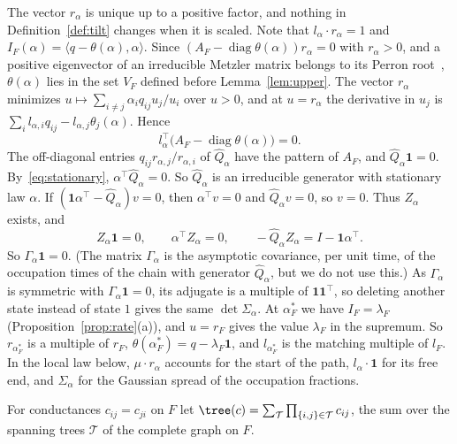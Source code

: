 The vector $r_\alpha$ is unique up to a positive factor, and nothing in
Definition~\ref{def:tilt} changes when it is scaled. Note that
$l_\alpha\cdot r_\alpha=1$ and $I_F(\alpha)=\langle q-\theta(\alpha),\alpha\rangle$.
Since $(A_F-\operatorname{diag}\theta(\alpha))r_\alpha=0$ with $r_\alpha>0$, and
a positive eigenvector of an irreducible Metzler matrix belongs to its Perron
root~\cite{bermanplemmons1994}, $\theta(\alpha)$ lies in the set $V_F$ defined
before Lemma~\ref{lem:upper}. The vector $r_\alpha$
minimizes $u\mapsto\sum_{i\ne j}\alpha_iq_{ij}u_j/u_i$ over $u>0$, and at
$u=r_\alpha$ the derivative in $u_j$ is
$\sum_il_{\alpha,i}q_{ij}-l_{\alpha,j}\theta_j(\alpha)$. Hence
\begin{equation}\label{eq:stationary}
l_\alpha^\top\bigl(A_F-\operatorname{diag}\theta(\alpha)\bigr)=0 .
\end{equation}
The off-diagonal entries $q_{ij}r_{\alpha,j}/r_{\alpha,i}$ of
$\widehat Q_\alpha$ have the pattern of $A_F$, and $\widehat Q_\alpha\mathbf 1=0$.
By~\eqref{eq:stationary}, $\alpha^\top\widehat Q_\alpha=0$. So
$\widehat Q_\alpha$ is an irreducible generator with stationary law $\alpha$.
If $(\mathbf 1\alpha^\top-\widehat Q_\alpha)v=0$, then $\alpha^\top v=0$ and
$\widehat Q_\alpha v=0$, so $v=0$. Thus $Z_\alpha$ exists, and
\begin{equation}\label{eq:Zprops}
Z_\alpha\mathbf 1=0,\qquad\alpha^\top Z_\alpha=0,\qquad
-\widehat Q_\alpha Z_\alpha=I-\mathbf 1\alpha^\top .
\end{equation}
So $\Gamma_\alpha\mathbf 1=0$. (The matrix $\Gamma_\alpha$ is the asymptotic
covariance, per unit time, of the occupation times of the chain with
generator $\widehat Q_\alpha$, but we do not use this.) As $\Gamma_\alpha$ is
symmetric with $\Gamma_\alpha\mathbf 1=0$, its adjugate is a multiple of
$\mathbf 1\mathbf 1^\top$, so deleting another state instead of state $1$
gives the same $\det\Sigma_\alpha$. At $\alpha^*_F$ we have
$I_F=\lambda_F$ (Proposition~\ref{prop:rate}(a)), and $u=r_F$ gives the value
$\lambda_F$ in the supremum. So $r_{\alpha^*_F}$ is a multiple of $r_F$,
$\theta(\alpha^*_F)=q-\lambda_F\mathbf 1$, and $l_{\alpha^*_F}$ is the
matching multiple of $l_F$. In the local law below, $\mu\cdot r_\alpha$
accounts for the start of the path, $l_\alpha\cdot\mathbf 1$ for its free end,
and $\Sigma_\alpha$ for the Gaussian spread of the occupation fractions.

For conductances $c_{ij}=c_{ji}$ on $F$ let
$\tree(c)=\sum_{\mathcal T}\prod_{\{i,j\}\in\mathcal T}c_{ij}$, the sum over
the spanning trees $\mathcal T$ of the complete graph on $F$.


